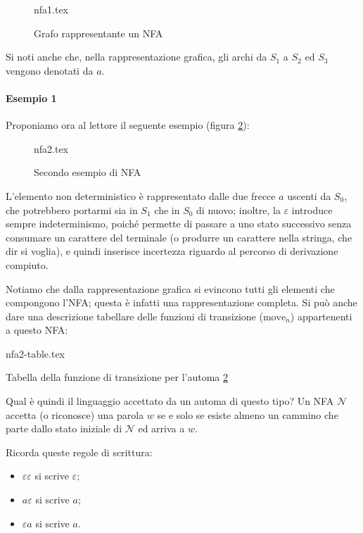 \documentclass[class=book, crop=false, oneside, 12pt]{standalone}
\begin{document}
\begin{figure}[htb]
	\centering
	{nfa1.tex}
    \caption{Grafo rappresentante un NFA}
	\label{nfa_grafo_esempio}
\end{figure}

\noindent Si noti anche che, nella rappresentazione grafica, gli archi da \(S_1\) a \(S_2\) ed \(S_3\) vengono denotati da \(a\).

\paragraph{Esempio 1}
Proponiamo ora al lettore il seguente esempio (figura \ref{nfa_grafo_2}):
\begin{figure}[htb]
    \centering
    {nfa2.tex}
    \caption{Secondo esempio di NFA}
    \label{nfa_grafo_2}
\end{figure}
L’elemento non deterministico è rappresentato dalle due frecce \(a\) uscenti da \(S_0\), che potrebbero portarmi sia in \(S_1\) che in \(S_0\) di nuovo; inoltre, la \(\varepsilon\) introduce sempre indeterminismo, poiché permette di passare a uno stato successivo senza consumare un carattere del terminale (o produrre un carattere nella stringa, che dir si voglia), e quindi inserisce incertezza riguardo al percorso di derivazione compiuto.

Notiamo che dalla rappresentazione grafica si evincono tutti gli elementi che compongono l’NFA; questa è infatti una rappresentazione completa.
Si può anche dare una descrizione tabellare delle funzioni di transizione (\(\textrm{move}_n\)) appartenenti a questo NFA:

\begin{table}[H]
	\centering
	{nfa2-table.tex}
    \caption{Tabella della funzione di transizione per l'automa \ref{nfa_grafo_2}}
    \label{nfa2-table}
\end{table} 

Qual è quindi il linguaggio accettato da un automa di questo tipo?\label{linguaggio_definito_da_un_automa} 
Un NFA \(\mathcal{N}\) accetta (o riconosce) una parola \(w\) se e solo se esiste almeno un cammino che parte dallo stato iniziale di \(\mathcal{N}\) ed arriva a \(w\).

Ricorda queste regole di scrittura:
\begin{itemize}
    \item \(\varepsilon \varepsilon\) si scrive \(\varepsilon\);
    \item \(a\varepsilon\) si scrive \(a\);
    \item \(\varepsilon a\) si scrive \(a\).
\end{itemize}
\end{document}
